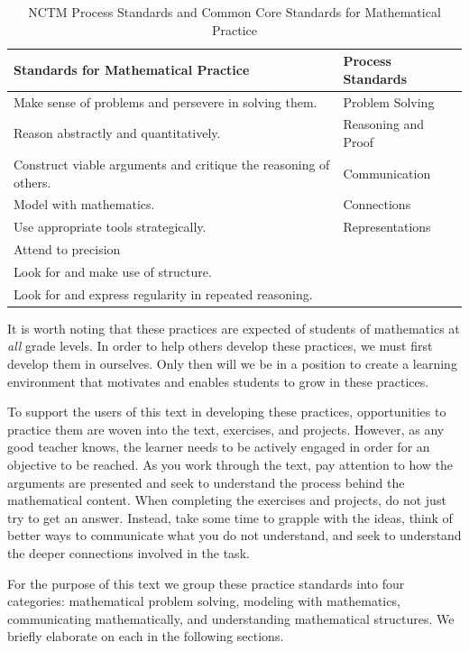 \documentclass[
]{book}
\theoremstyle{definition}
\theoremstyle{definition}
\theoremstyle{definition}
\theoremstyle{remark}
\begin{document}
\begin{table}

\caption{\label{tab:SMPs}NCTM Process Standards and  Common Core Standards for Mathematical Practice}
\centering
\begin{tabular}[t]{l|l}
\hline
Standards for Mathematical Practice & Process Standards\\
\hline
Make sense of problems and persevere in solving them. & Problem Solving\\
\hline
Reason abstractly and quantitatively. & Reasoning and Proof\\
\hline
Construct viable arguments and critique the reasoning of others. & Communication\\
\hline
Model with mathematics. & Connections\\
\hline
Use appropriate tools strategically. & Representations\\
\hline
Attend to precision & \\
\hline
Look for and make use of structure. & \\
\hline
Look for and express regularity in repeated reasoning. & \\
\hline
\end{tabular}
\end{table}

It is worth noting that these practices are expected of students of mathematics at \emph{all} grade levels. In order to help others develop these practices, we must first develop them in ourselves. Only then will we be in a position to create a learning environment that motivates and enables students to grow in these practices.

To support the users of this text in developing these practices, opportunities to practice them are woven into the text, exercises, and projects. However, as any good teacher knows, the learner needs to be actively engaged in order for an objective to be reached. As you work through the text, pay attention to how the arguments are presented and seek to understand the process behind the mathematical content. When completing the exercises and projects, do not just try to get an answer. Instead, take some time to grapple with the ideas, think of better ways to communicate what you do not understand, and seek to understand the deeper connections involved in the task.

For the purpose of this text we group these practice standards into four categories: mathematical problem solving, modeling with mathematics, communicating mathematically, and understanding mathematical structures. We briefly elaborate on each in the following sections.
\end{document}
